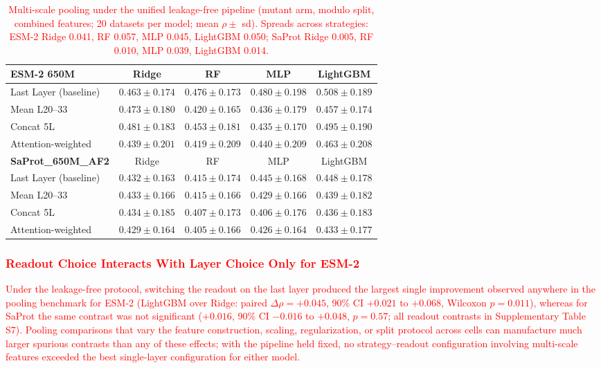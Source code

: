 \documentclass[11pt,a4paper]{article}
\newcommand{\rev}[1]{\textcolor{red}{#1}}
\begin{document}
\begin{table}[ht]
\centering
\caption{\rev{Multi-scale pooling under the unified leakage-free pipeline (mutant
arm, modulo split, combined features; 20 datasets per model; mean $\rho \pm$ sd).
Spreads across strategies: ESM-2 Ridge 0.041, RF 0.057, MLP 0.045, LightGBM 0.050;
SaProt Ridge 0.005, RF 0.010, MLP 0.039, LightGBM 0.014.}}
\label{tab:pooling}
\begin{tabular}{lcccc}
\toprule
\textbf{ESM-2 650M} & Ridge & RF & MLP & LightGBM \\
\midrule
Last Layer (baseline) & $0.463 \pm 0.174$ & $0.476 \pm 0.173$ & $0.480 \pm 0.198$ & $\mathbf{0.508} \pm 0.189$ \\
Mean L20--33          & $0.473 \pm 0.180$ & $0.420 \pm 0.165$ & $0.436 \pm 0.179$ & $0.457 \pm 0.174$ \\
Concat 5L             & $0.481 \pm 0.183$ & $0.453 \pm 0.181$ & $0.435 \pm 0.170$ & $0.495 \pm 0.190$ \\
Attention-weighted    & $0.439 \pm 0.201$ & $0.419 \pm 0.209$ & $0.440 \pm 0.209$ & $0.463 \pm 0.208$ \\
\midrule
\textbf{SaProt\_650M\_AF2} & Ridge & RF & MLP & LightGBM \\
\midrule
Last Layer (baseline) & $0.432 \pm 0.163$ & $0.415 \pm 0.174$ & $0.445 \pm 0.168$ & $\mathbf{0.448} \pm 0.178$ \\
Mean L20--33          & $0.433 \pm 0.166$ & $0.415 \pm 0.166$ & $0.429 \pm 0.166$ & $0.439 \pm 0.182$ \\
Concat 5L             & $0.434 \pm 0.185$ & $0.407 \pm 0.173$ & $0.406 \pm 0.176$ & $0.436 \pm 0.183$ \\
Attention-weighted    & $0.429 \pm 0.164$ & $0.405 \pm 0.166$ & $0.426 \pm 0.164$ & $0.433 \pm 0.177$ \\
\bottomrule
\end{tabular}
\end{table}

\textcolor{red}{\subsubsection{\rev{Readout Choice Interacts With Layer Choice Only for ESM-2}}}

\textcolor{red}{\rev{Under the leakage-free protocol, switching the readout on the last layer
produced the largest single improvement observed anywhere in the pooling
benchmark for ESM-2 (LightGBM over Ridge: paired $\Delta\rho = +0.045$,
90\% CI $+0.021$ to $+0.068$, Wilcoxon $p = 0.011$), whereas for SaProt the
same contrast was not significant ($+0.016$, 90\% CI $-0.016$ to $+0.048$,
$p = 0.57$; all readout contrasts in Supplementary Table S7). Pooling
comparisons that vary the feature construction,
scaling, regularization, or split protocol across cells can manufacture much
larger spurious contrasts than any of these effects; with the pipeline held
fixed, no strategy--readout configuration involving multi-scale features
exceeded the best single-layer configuration for either model.}}
\end{document}
